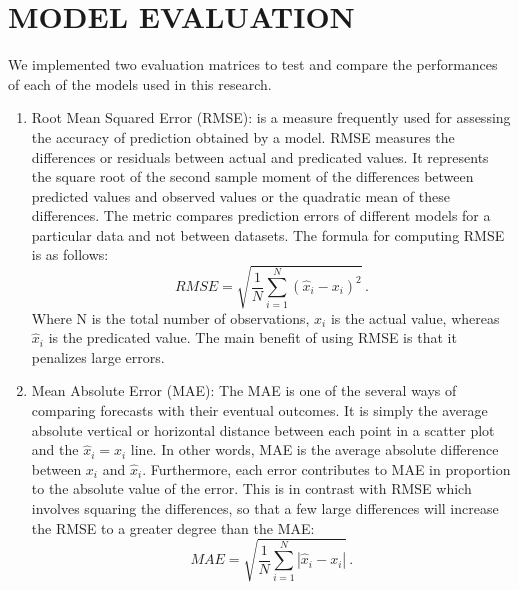 \documentclass[12pt,italian, twoside]{report}
\begin{document}
\section{MODEL EVALUATION}
We implemented two evaluation matrices to test and compare the performances of each of the models used in this research.
\begin{enumerate}
	\item Root Mean Squared Error (RMSE): is a measure frequently used for assessing the accuracy of prediction obtained by a model. RMSE measures the differences or residuals between actual and predicated values. It represents the square root of the second sample moment of the differences between predicted values and observed values or the quadratic mean of these differences. The metric compares prediction errors of different models for a particular data and not between datasets. The formula for computing RMSE is as follows: 
	\begin{equation}
		RMSE= \sqrt{\frac{1}{N}\sum^N_{i=1} (\hat{x}_i - x_i)^2}  \, .
		\label{eq:RMSE}
	\end{equation}
	Where N is the total number of observations, \(x_i\)  is the actual value, whereas \(\hat{x}_i\) is the predicated value. The main benefit of using RMSE is that it penalizes large errors. 
	\item 	Mean Absolute Error (MAE): The MAE is one of the several ways of comparing forecasts with their eventual outcomes. It is simply the average absolute vertical or horizontal distance between each point in a scatter plot and the \(\hat{x}_i=x_i\) line. In other words, MAE is the average absolute difference between \(x_i\) and \(\hat{x}_i\). Furthermore, each error contributes to MAE in proportion to the absolute value of the error. This is in contrast with RMSE which involves squaring the differences, so that a few large differences will increase the RMSE to a greater degree than the MAE:
	\begin{equation}
		MAE= \sqrt{\frac{1}{N}\sum^N_{i=1} |\hat{x}_i - x_i|}  \, .
		\label{eq:MAE}
	\end{equation}
\end{enumerate}
\end{document}
